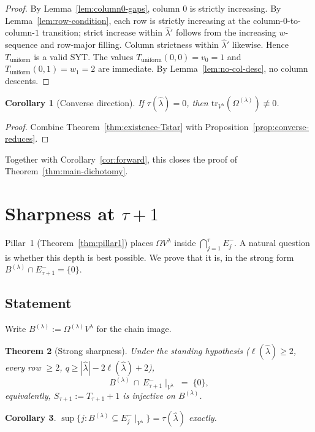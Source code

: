 \documentclass[11pt]{article}
\newtheorem{theorem}{Theorem}[section]
\newtheorem{corollary}[theorem]{Corollary}
\theoremstyle{definition}
\newcommand{\Vlam}{V^{\lambda}}
\newcommand{\Om}{\Omega}
\newcommand{\bla}{\widehat\lambda}
\newcommand{\elh}{\ell(\bla)}
\newcommand{\tr}{\mathrm{tr}}
\newcommand{\Eminus}{E^{-}}
\newcommand{\Tunif}{T_{\mathrm{uniform}}}
\begin{document}
\begin{proof}
By Lemma~\ref{lem:column0-gaps}, column $0$ is strictly increasing.  By Lemma~\ref{lem:row-condition}, each row is strictly increasing at the column-$0$-to-column-$1$ transition; strict increase within $\bla'$ follows from the increasing $w$-sequence and row-major filling.  Column strictness within $\bla'$ likewise.  Hence $\Tunif$ is a valid SYT.  The values $\Tunif(0,0) = v_0 = 1$ and $\Tunif(0,1) = w_1 = 2$ are immediate.  By Lemma~\ref{lem:no-col-desc}, no column descents.
\end{proof}

\begin{corollary}[Converse direction]\label{cor:converse}
If $\tau(\bla) = 0$, then $\tr_{\Vlam}(\Om^{(\lambda)}) \not\equiv 0$.
\end{corollary}

\begin{proof}
Combine Theorem~\ref{thm:existence-Tstar} with Proposition~\ref{prop:converse-reduces}.
\end{proof}

Together with Corollary~\ref{cor:forward}, this closes the proof of Theorem~\ref{thm:main-dichotomy}.

\section{Sharpness at $\tau + 1$}\label{sec:sharpness}

Pillar~1 (Theorem~\ref{thm:pillar1}) places $\Om \Vlam$ inside
$\bigcap_{j=1}^{\tau} \Eminus_j$.  A natural question is whether this depth
is best possible.  We prove that it is, in the strong form $B^{(\lambda)} \cap \Eminus_{\tau+1} = \{0\}$.

\subsection{Statement}

Write $B^{(\lambda)} := \Om^{(\lambda)} \Vlam$ for the chain image.

\begin{theorem}[Strong sharpness]\label{thm:sharpness}
Under the standing hypothesis ($\elh \ge 2$, every row $\ge 2$, $q \ge |\bla| - 2\elh + 2$),
\[
   B^{(\lambda)} \,\cap\, \Eminus_{\tau+1}\!\mid_{\Vlam} \;=\; \{0\},
\]
equivalently, $S_{\tau+1} := T_{\tau+1} + 1$ is \emph{injective} on $B^{(\lambda)}$.
\end{theorem}

\begin{corollary}\label{cor:depth-exact}
$\sup\{j : B^{(\lambda)} \subseteq \Eminus_j\!\mid_{\Vlam}\} = \tau(\bla)$
exactly.
\end{corollary}
\end{document}
